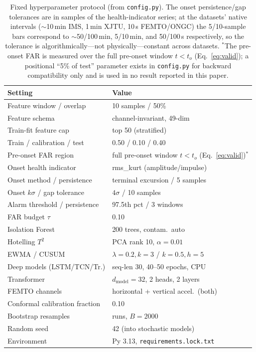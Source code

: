 \documentclass[journal]{IEEEtran}
\begin{document}
\begin{table}[t]
\caption{Fixed hyperparameter protocol (from \texttt{config.py}). The onset
persistence/gap tolerances are in samples of the health-indicator series; at the
datasets' native intervals ($\sim$10\,min IMS, 1\,min XJTU, 10\,s FEMTO/ONGC) the
5/10-sample bars correspond to $\sim$50/100\,min, 5/10\,min, and 50/100\,s
respectively, so the tolerance is algorithmically---not physically---constant
across datasets. $^{\ast}$The pre-onset FAR is measured over the full pre-onset
window $t<t_o$ (Eq.~\ref{eq:valid}); a positional ``5\% of test'' parameter exists
in \texttt{config.py} for backward compatibility only and is used in no result
reported in this paper.}
\label{tab:hparams}
\centering
\footnotesize
\setlength{\tabcolsep}{4pt}
\begin{tabular}{@{}ll@{}}
\toprule
Setting & Value \\
\midrule
Feature window / overlap        & 10 samples / 50\% \\
Feature schema                  & channel-invariant, 49-dim \\
Train-fit feature cap           & top 50 (stratified) \\
Train / calibration / test      & 0.50 / 0.10 / 0.40 \\
Pre-onset FAR region            & full pre-onset window $t<t_o$ (Eq.~\ref{eq:valid})$^{\ast}$ \\
Onset health indicator          & rms\_kurt (amplitude/impulse) \\
Onset method / persistence      & terminal excursion / 5 samples \\
Onset $k\sigma$ / gap tolerance & $4\sigma$ / 10 samples \\
Alarm threshold / persistence   & 97.5th pct / 3 windows \\
FAR budget $\tau$               & 0.10 \\
Isolation Forest                & 200 trees, contam.\ auto \\
Hotelling $T^2$                 & PCA rank 10, $\alpha{=}0.01$ \\
EWMA / CUSUM                    & $\lambda{=}0.2,k{=}3$ / $k{=}0.5,h{=}5$ \\
Deep models (LSTM/TCN/Tr.)      & seq-len 30, 40--50 epochs, CPU \\
Transformer                     & $d_{\text{model}}{=}32$, 2 heads, 2 layers \\
FEMTO channels                  & horizontal + vertical accel.\ (both) \\
Conformal calibration fraction  & 0.10 \\
Bootstrap resamples             & runs, $B{=}2000$ \\
Random seed                     & 42 (into stochastic models) \\
Environment                     & Py 3.13, \texttt{requirements.lock.txt} \\
\bottomrule
\end{tabular}
\end{table}
\end{document}
